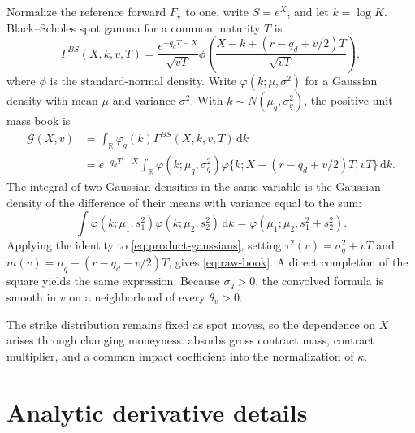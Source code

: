 \documentclass[11pt]{article}
\newcommand{\dd}{\,\mathrm{d}}
\begin{document}
Normalize the reference forward $F_\star$ to one, write $S=e^X$, and let
$k=\log K$.  Black--Scholes spot gamma for a common maturity $T$ is
\begin{equation}
\Gamma^{BS}(X,k,v,T)
=\frac{e^{-q_dT-X}}{\sqrt{vT}}
\phi\!\left(\frac{X-k+(r-q_d+v/2)T}{\sqrt{vT}}\right), \label{eq:bs-gamma-app}
\end{equation}
where $\phi$ is the standard-normal density.  Write
$\varphi(k;\mu,\sigma^2)$ for a Gaussian density with mean $\mu$ and variance $\sigma^2$.
With
$k\sim N(\mu_q,\sigma_q^2)$, the positive unit-mass book is
\begin{align}
\mathcal G(X,v)
&=\int_{\mathbb R}\varphi_q(k)\Gamma^{BS}(X,k,v,T)\dd k \nonumber\\
&=e^{-q_dT-X}\int_{\mathbb R}
\varphi(k;\mu_q,\sigma_q^2)
\varphi\{k;X+(r-q_d+v/2)T,vT\}\dd k. \label{eq:product-gaussians}
\end{align}
The integral of two Gaussian densities in the same variable is the Gaussian density of the
difference of their means with variance equal to the sum:
\[
\int\varphi(k;\mu_1,s_1^2)\varphi(k;\mu_2,s_2^2)\dd k
=\varphi(\mu_1;\mu_2,s_1^2+s_2^2).
\]
Applying the identity to \cref{eq:product-gaussians}, setting
$\tau^2(v)=\sigma_q^2+vT$ and
$m(v)=\mu_q-(r-q_d+v/2)T$, gives \cref{eq:raw-book}.  A direct completion of
the square yields the same expression.  Because $\sigma_q>0$, the convolved formula is
smooth in $v$ on a neighborhood of every $\theta_v>0$.

The strike distribution remains fixed as spot moves, so the dependence on $X$ arises through
changing moneyness.   absorbs gross contract mass, contract
multiplier, and a common impact coefficient into the normalization of $\kappa$.

\section{Analytic derivative details}
\label{app:derivatives}
\end{document}
